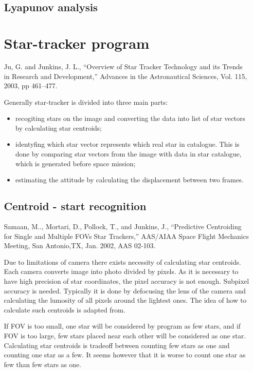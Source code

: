 \documentclass[12pt,a4paper,oneside]{article}
\begin{document}
\subsection{Lyapunov analysis}

\newpage
\section{Star-tracker program}
Ju, G. and Junkins, J. L., “Overview of Star Tracker Technology and its Trends in
Research and Development,” Advances in the Astronautical Sciences, Vol. 115, 2003, pp
461–477.\par
Generally star-tracker is divided into three main parts\cite{6187242}:
\begin{itemize}
\item recogiting stars on the image and converting the data into list of star vectors by calculating star centroids;
\item identyfing which star vector represents which real star in catalogue. This is done by comparing star vectors from the image with data in star catalogue, which is generated before space mission;
\item estimating the attitude by calculating the displacement between two frames.
\end{itemize}
\subsection{Centroid - start recognition}
Samaan, M.., Mortari, D., Pollock, T., and Junkins, J., “Predictive Centroiding for Single and Multiple FOVs Star Trackers,” AAS/AIAA Space Flight Mechanics Meeting, San
Antonio,TX, Jan. 2002, AAS 02-103.

Due to limitations of camera there exists necessity of calculating star centroids. Each camera converts image into photo divided by pixels. As it is necessary to have high precision of star coordinates, the pixel accuracy is not enough. Subpixel accuracy is needed. Typically it is done by defocusing the lens of the camera and calculating the lumosity of all pixels around the lightest ones. The idea of how to calculate such centroids is adapted from\cite{6187242}.

If FOV is too small, one star will be considered by program as few stars, and if FOV is too large, few stars placed near each other will be considered as one star. Calculating star centroids is tradeoff between counting few stars as one and counting one star as a few. It seems however that it is worse to count one star as few than few stars as one.
\end{document}
